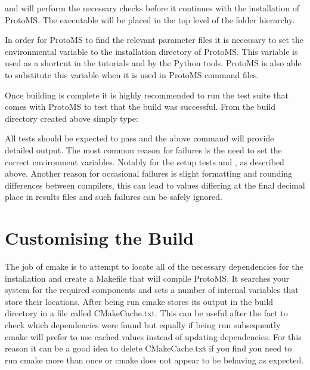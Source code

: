 \documentclass[letterpaper,10pt,english]{sphinxmanual}
\begin{document}
and  will perform the necessary checks before it continues with the installation of ProtoMS. The executable will be placed in the top level of the folder hierarchy.

In order for ProtoMS to find the relevant parameter files it is necessary to set the environmental variable  to the installation directory of ProtoMS. This variable is used as a shortcut in the tutorials and by the Python tools. ProtoMS is also able to substitute this variable when it is used in ProtoMS command files.

Once building is complete it is highly recommended to run the test suite that comes with ProtoMS to test that the build was successful. From the build directory created above simply type:

%
\begin{sphinxVerbatim}[commandchars=\\\{\}]
 
\end{sphinxVerbatim}

All tests should be expected to pass and the above command will provide detailed output. The most common reason for failures is the need to set the correct environment variables. Notably  for the setup tests and , as described above. Another reason for occasional failures is slight formatting and rounding differences between compilers, this can lead to values differing at the final decimal place in results files and such failures can be safely ignored.


\section{Customising the Build}
\label{\detokenize{compilation:customising-the-build}}\label{\detokenize{compilation:custom-build}}

The job of cmake is to attempt to locate all of the necessary dependencies for the installation and create a Makefile that will compile ProtoMS. It searches your system for the required components and sets a number of internal variables that store their locations. After being run cmake stores its output in the build directory in a file called CMakeCache.txt. This can be useful after the fact to check which dependencies were found but equally if being run subsequently cmake will prefer to use cached values instead of updating dependencies. For this reason it can be a good idea to delete CMakeCache.txt if you find you need to run cmake more than once or cmake does not appear to be behaving as expected.
\end{document}
